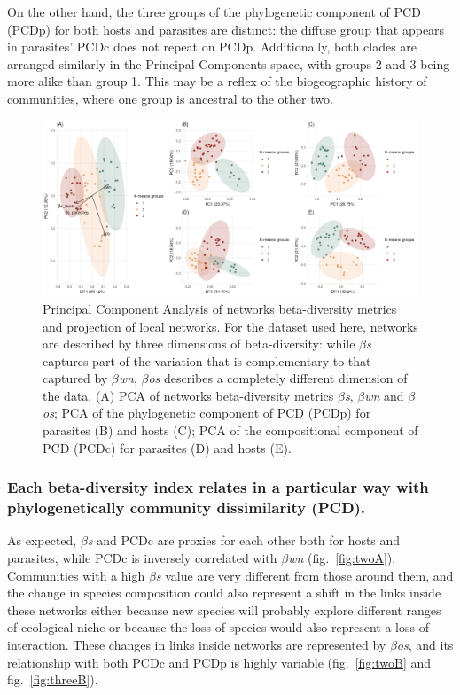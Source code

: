 \documentclass[11pt]{article}
\makeatletter
\def\maxwidth{\ifdim\Gin@nat@width>\linewidth\linewidth
\else\Gin@nat@width\fi}
\let\Oldincludegraphics\includegraphics
\renewcommand{\includegraphics}[1]{\Oldincludegraphics[width=\maxwidth]{#1}}
\makeatother
\begin{document}
On the other hand, the three groups of the phylogenetic component of PCD
(PCDp) for both hosts and parasites are distinct: the diffuse group that
appears in parasites' PCDc does not repeat on PCDp. Additionally, both
clades are arranged similarly in the Principal Components space, with
groups 2 and 3 being more alike than group 1. This may be a reflex of
the biogeographic history of communities, where one group is ancestral
to the other two.

\begin{figure}
\hypertarget{fig:one}{%
\centering
\includegraphics{figures/fig1.png}
\caption{Principal Component Analysis of networks beta-diversity metrics
and projection of local networks. For the dataset used here, networks
are described by three dimensions of beta-diversity: while
\emph{\(\beta\)s} captures part of the variation that is complementary
to that captured by \emph{\(\beta\)wn}, \emph{\(\beta\)os} describes a
completely different dimension of the data. (A) PCA of networks
beta-diversity metrics \emph{\(\beta\)s}, \emph{\(\beta\)wn} and
\emph{\(\beta\)os}; PCA of the phylogenetic component of PCD (PCDp) for
parasites (B) and hosts (C); PCA of the compositional component of PCD
(PCDc) for parasites (D) and hosts (E).}\label{fig:one}
}
\end{figure}

\hypertarget{each-beta-diversity-index-relates-in-a-particular-way-with-phylogenetically-community-dissimilarity-pcd.}{%
\subsubsection{Each beta-diversity index relates in a particular way
with phylogenetically community dissimilarity
(PCD).}\label{each-beta-diversity-index-relates-in-a-particular-way-with-phylogenetically-community-dissimilarity-pcd.}}

As expected, \emph{\(\beta\)s} and PCDc are proxies for each other both
for hosts and parasites, while PCDc is inversely correlated with
\emph{\(\beta\)wn} (fig.~\ref{fig:twoA}). Communities with a high
\emph{\(\beta\)s} value are very different from those around them, and
the change in species composition could also represent a shift in the
links inside these networks either because new species will probably
explore different ranges of ecological niche or because the loss of
species would also represent a loss of interaction. These changes in
links inside networks are represented by \emph{\(\beta\)os}, and its
relationship with both PCDc and PCDp is highly variable
(fig.~\ref{fig:twoB} and fig.~\ref{fig:threeB}).
\end{document}
